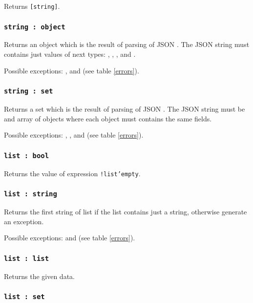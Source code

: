 Returns \texttt{[string]}.

\subsubsection{\texttt{string : object}}

Returns an object which is the result of parsing of JSON \str. The JSON string must contains just values of next types: \bool, \integer, \double, \str{} and \listtype.

Possible exceptions: ,  and  (see table \ref{errors}).

\subsubsection{\texttt{string : set}}

Returns a set which is the result of parsing of JSON \str. The JSON string must be and array of objects where each object must contains the same fields.

Possible exceptions: , ,  and  (see table \ref{errors}).

\subsubsection{\texttt{list : bool}}

Returns the value of expression \texttt{!list'empty}.

\subsubsection{\texttt{list : string}}

Returns the first string of list if the list contains just a string, otherwise generate an exception.

Possible exceptions:  and  (see table \ref{errors}).

\subsubsection{\texttt{list : list}}

Returns the given data.

\subsubsection{\texttt{list : set}}

